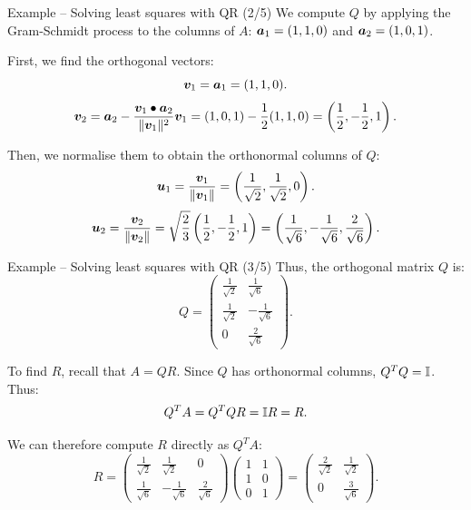 \documentclass[aspectratio=169]{beamer}\usepackage[]{graphicx}\usepackage[]{xcolor}
\begin{document}
\begin{frame}{Example -- Solving least squares with QR (2/5)}
We compute $Q$ by applying the Gram-Schmidt process to the columns of $A$: $\bm{a}_1 = (1, 1, 0)$ and $\bm{a}_2 = (1, 0, 1)$.

\vfill
First, we find the orthogonal vectors:
\[
\bm{v}_1 = \bm{a}_1 = (1, 1, 0).
\]
\[
\bm{v}_2 = \bm{a}_2 - \frac{\bm{v}_1 \bullet \bm{a}_2}{\|\bm{v}_1\|^2}\bm{v}_1 = (1, 0, 1) - \frac{1}{2}(1, 1, 0) = \left(\frac{1}{2}, -\frac{1}{2}, 1\right).
\]

\vfill
Then, we normalise them to obtain the orthonormal columns of $Q$:
\[
\bm{u}_1 = \frac{\bm{v}_1}{\|\bm{v}_1\|} = \left(\frac{1}{\sqrt{2}}, \frac{1}{\sqrt{2}}, 0\right).
\]
\[
\bm{u}_2 = \frac{\bm{v}_2}{\|\bm{v}_2\|} = \sqrt{\frac{2}{3}}\left(\frac{1}{2}, -\frac{1}{2}, 1\right) = \left(\frac{1}{\sqrt{6}}, -\frac{1}{\sqrt{6}}, \frac{2}{\sqrt{6}}\right).
\]
\end{frame}


\begin{frame}{Example -- Solving least squares with QR (3/5)}
Thus, the orthogonal matrix $Q$ is:
\[
Q = \begin{pmatrix} \frac{1}{\sqrt{2}} & \frac{1}{\sqrt{6}} \\ \frac{1}{\sqrt{2}} & -\frac{1}{\sqrt{6}} \\ 0 & \frac{2}{\sqrt{6}} \end{pmatrix}.
\]

\vfill
To find $R$, recall that $A = QR$. Since $Q$ has orthonormal columns, $Q^T Q = \mathbb{I}$. Thus:
\[
Q^T A = Q^T Q R = \mathbb{I} R = R.
\]

\vfill
We can therefore compute $R$ directly as $Q^T A$:
\[
R = \begin{pmatrix} \frac{1}{\sqrt{2}} & \frac{1}{\sqrt{2}} & 0 \\ \frac{1}{\sqrt{6}} & -\frac{1}{\sqrt{6}} & \frac{2}{\sqrt{6}} \end{pmatrix} \begin{pmatrix} 1 & 1 \\ 1 & 0 \\ 0 & 1 \end{pmatrix} = \begin{pmatrix} \frac{2}{\sqrt{2}} & \frac{1}{\sqrt{2}} \\ 0 & \frac{3}{\sqrt{6}} \end{pmatrix}.
\]
\end{frame}
\end{document}
